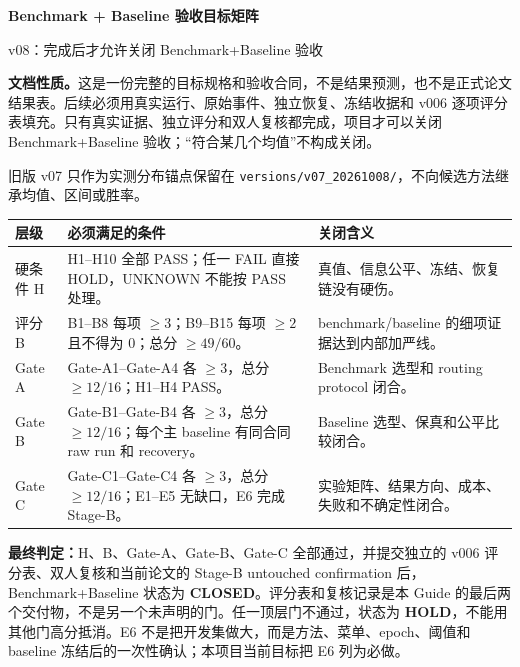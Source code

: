 \documentclass[10pt,letterpaper]{article}
\newcommand{\B}[1]{{\color{GuideBlue}#1}}
\newcommand{\sect}[1]{\vspace{4pt}{\large\bfseries\color{GuideBlue}#1}\par\vspace{2pt}}
\newenvironment{clean}{\begin{center}\fontsize{8.55}{10.05}\selectfont\setlength{\tabcolsep}{3.7pt}\renewcommand{\arraystretch}{1.04}}{\end{center}}
\begin{document}
{\LARGE\bfseries Benchmark + Baseline 验收目标矩阵}\par
{\large v08：完成后才允许关闭 Benchmark+Baseline 验收}\par
\vspace{3pt}
\textbf{文档性质。}这是一份\B{完整的目标规格和验收合同}，不是结果预测，也不是正式论文结果表。后续必须用真实运行、原始事件、独立恢复、冻结收据和 v006 逐项评分表填充。只有真实证据、独立评分和双人复核都完成，项目才可以关闭 Benchmark+Baseline 验收；“符合某几个均值”不构成关闭。\par 旧版 v07 只作为实测分布锚点保留在 \texttt{versions/v07\_20261008/}，不向候选方法继承均值、区间或胜率。

\sect{1. 关闭条件：先过硬门，再过三门}
\begin{clean}
\begin{tabular}{@{}p{.14\linewidth}p{.48\linewidth}p{.25\linewidth}@{}}
\toprule
层级 & 必须满足的条件 & 关闭含义\\
\midrule
硬条件 H & H1--H10 全部 PASS；任一 FAIL 直接 HOLD，UNKNOWN 不能按 PASS 处理。 & 真值、信息公平、冻结、恢复链没有硬伤。\\
评分 B & B1--B8 每项 $\ge3$；B9--B15 每项 $\ge2$ 且不得为 0；总分 $\ge49/60$。 & benchmark/baseline 的细项证据达到内部加严线。\\
Gate A & Gate-A1--Gate-A4 各 $\ge3$，总分 $\ge12/16$；H1--H4 PASS。 & Benchmark 选型和 routing protocol 闭合。\\
Gate B & Gate-B1--Gate-B4 各 $\ge3$，总分 $\ge12/16$；每个主 baseline 有同合同 raw run 和 recovery。 & Baseline 选型、保真和公平比较闭合。\\
Gate C & Gate-C1--Gate-C4 各 $\ge3$，总分 $\ge12/16$；E1--E5 无缺口，E6 完成 Stage-B。 & 实验矩阵、结果方向、成本、失败和不确定性闭合。\\
\bottomrule
\end{tabular}
\end{clean}
\textbf{最终判定：}H、B、Gate-A、Gate-B、Gate-C 全部通过，并提交独立的 v006 评分表、双人复核和当前论文的 Stage-B untouched confirmation 后，Benchmark+Baseline 状态为 \textbf{CLOSED}。评分表和复核记录是本 Guide 的最后两个交付物，不是另一个未声明的门。任一顶层门不通过，状态为 \textbf{HOLD}，不能用其他门高分抵消。E6 不是把开发集做大，而是方法、菜单、epoch、阈值和 baseline 冻结后的一次性确认；本项目当前目标把 E6 列为必做。
\end{document}
